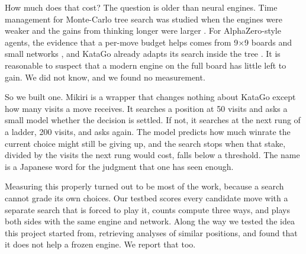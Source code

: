 \documentclass{article}
\begin{document}
How much does that cost? The question is older than neural engines. Time management for Monte-Carlo tree search was studied when the engines were weaker and the gains from thinking longer were larger \cite{huang2010time,baier2016time}. For AlphaZero-style agents, the evidence that a per-move budget helps comes from 9$\times$9 boards and small networks \cite{lan2021learning,ye2022spending,muppidi2026finding}, and KataGo already adapts its search inside the tree \cite{katago_methods}. It is reasonable to suspect that a modern engine on the full board has little left to gain. We did not know, and we found no measurement.

So we built one. Mikiri is a wrapper that changes nothing about KataGo except how many visits a move receives. It searches a position at 50 visits and asks a small model whether the decision is settled. If not, it searches at the next rung of a ladder, 200 visits, and asks again. The model predicts how much winrate the current choice might still be giving up, and the search stops when that stake, divided by the visits the next rung would cost, falls below a threshold. The name is a Japanese word for the judgment that one has seen enough.

Measuring this properly turned out to be most of the work, because a search cannot grade its own choices. Our testbed scores every candidate move with a separate search that is forced to play it, counts compute three ways, and plays both sides with the same engine and network. Along the way we tested the idea this project started from, retrieving analyses of similar positions, and found that it does not help a frozen engine. We report that too.
\end{document}
